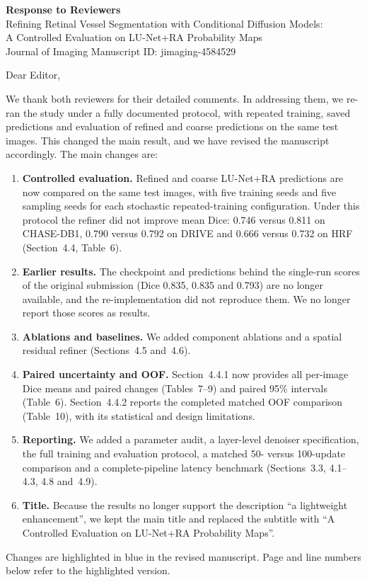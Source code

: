 \documentclass[11pt,a4paper]{article}
\begin{document}
\begin{center}
{\Large\bfseries Response to Reviewers}\\[4pt]
{\large Refining Retinal Vessel Segmentation with Conditional Diffusion Models:\\ A Controlled Evaluation on LU-Net+RA Probability Maps}\\[4pt]
Journal of Imaging \textendash{} Manuscript ID: jimaging-4584529
\end{center}

Dear Editor,

We thank both reviewers for their detailed comments. In addressing them, we re-ran the study under a fully documented protocol, with repeated training, saved predictions and evaluation of refined and coarse predictions on the same test images. This changed the main result, and we have revised the manuscript accordingly. The main changes are:
\begin{enumerate}[leftmargin=*,itemsep=2pt]
\item \textbf{Controlled evaluation.} Refined and coarse LU-Net+RA predictions are now compared on the same test images, with five training seeds and five sampling seeds for each stochastic repeated-training configuration. Under this protocol the refiner did not improve mean Dice: 0.746 versus 0.811 on CHASE-DB1, 0.790 versus 0.792 on DRIVE and 0.666 versus 0.732 on HRF (Section~4.4, Table~6).
\item \textbf{Earlier results.} The checkpoint and predictions behind the single-run scores of the original submission (Dice 0.835, 0.835 and 0.793) are no longer available, and the re-implementation did not reproduce them. We no longer report those scores as results.
\item \textbf{Ablations and baselines.} We added component ablations and a spatial residual refiner (Sections~4.5 and~4.6).
\item \textbf{Paired uncertainty and OOF.} Section~4.4.1 now provides all per-image Dice means and paired changes (Tables~7--9) and paired 95\% intervals (Table~6). Section~4.4.2 reports the completed matched OOF comparison (Table~10), with its statistical and design limitations.
\item \textbf{Reporting.} We added a parameter audit, a layer-level denoiser specification, the full training and evaluation protocol, a matched 50- versus 100-update comparison and a complete-pipeline latency benchmark (Sections~3.3, 4.1--4.3, 4.8 and~4.9).
\item \textbf{Title.} Because the results no longer support the description ``a lightweight enhancement'', we kept the main title and replaced the subtitle with ``A Controlled Evaluation on LU-Net+RA Probability Maps''.
\end{enumerate}
Changes are highlighted in blue in the revised manuscript. Page and line numbers below refer to the highlighted version.
\end{document}
